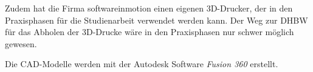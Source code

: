 Zudem hat die Firma softwareinmotion einen eigenen 3D-Drucker, der in den Praxisphasen für die Studienarbeit verwendet werden kann. Der Weg zur DHBW für das Abholen der 3D-Drucke wäre in den Praxisphasen nur schwer möglich gewesen.

Die CAD-Modelle werden mit der Autodesk Software \textit{Fusion 360} erstellt.







